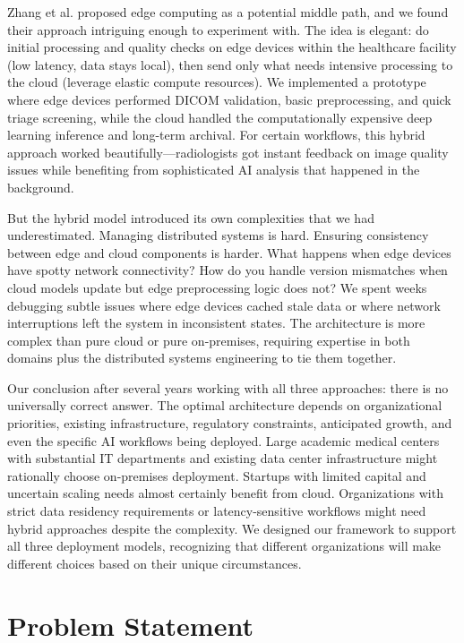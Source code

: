 \documentclass[12pt,a4paper]{article}
\begin{document}
Zhang et al. \cite{zhang2020medical} proposed edge computing as a potential middle path, and we found their approach intriguing enough to experiment with. The idea is elegant: do initial processing and quality checks on edge devices within the healthcare facility (low latency, data stays local), then send only what needs intensive processing to the cloud (leverage elastic compute resources). We implemented a prototype where edge devices performed DICOM validation, basic preprocessing, and quick triage screening, while the cloud handled the computationally expensive deep learning inference and long-term archival. For certain workflows, this hybrid approach worked beautifully—radiologists got instant feedback on image quality issues while benefiting from sophisticated AI analysis that happened in the background.

But the hybrid model introduced its own complexities that we had underestimated. Managing distributed systems is hard. Ensuring consistency between edge and cloud components is harder. What happens when edge devices have spotty network connectivity? How do you handle version mismatches when cloud models update but edge preprocessing logic does not? We spent weeks debugging subtle issues where edge devices cached stale data or where network interruptions left the system in inconsistent states. The architecture is more complex than pure cloud or pure on-premises, requiring expertise in both domains plus the distributed systems engineering to tie them together.

Our conclusion after several years working with all three approaches: there is no universally correct answer. The optimal architecture depends on organizational priorities, existing infrastructure, regulatory constraints, anticipated growth, and even the specific AI workflows being deployed. Large academic medical centers with substantial IT departments and existing data center infrastructure might rationally choose on-premises deployment. Startups with limited capital and uncertain scaling needs almost certainly benefit from cloud. Organizations with strict data residency requirements or latency-sensitive workflows might need hybrid approaches despite the complexity. We designed our framework to support all three deployment models, recognizing that different organizations will make different choices based on their unique circumstances.

\section{Problem Statement}
\end{document}
